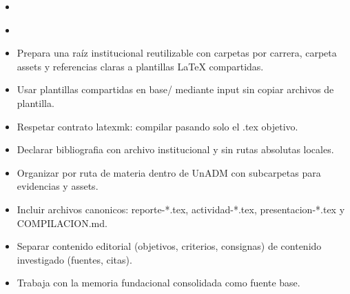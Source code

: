\documentclass[12pt]{article}
\begin{document}
\begin{itemize}[leftmargin=*]
  \item \\%
  \item \\%
  \item Prepara una raíz institucional reutilizable con carpetas por carrera, carpeta assets y referencias claras a plantillas LaTeX compartidas.
  \item Usar plantillas compartidas en base/ mediante input sin copiar archivos de plantilla.
  \item Respetar contrato latexmk: compilar pasando solo el .tex objetivo.
  \item Declarar bibliografia con archivo institucional y sin rutas absolutas locales.
  \item Organizar por ruta de materia dentro de UnADM con subcarpetas para evidencias y assets.
  \item Incluir archivos canonicos: reporte-*.tex, actividad-*.tex, presentacion-*.tex y COMPILACION.md.
  \item Separar contenido editorial (objetivos, criterios, consignas) de contenido investigado (fuentes, citas).
  \item Trabaja con la memoria fundacional consolidada como fuente base.
\end{itemize}
\end{document}
